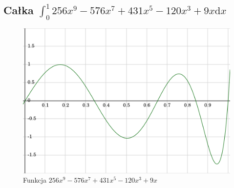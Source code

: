 \documentclass[11pt,leqno]{article}
\begin{document}
\subsection{Całka $\int_{0}^{1}256x^9 - 576x^7 + 431x^5 - 120x^3 + 9x\mathrm{d}x$}
\begin{center}\begin{figure}[ht]\begin{center}
    \caption{Funkcja $256x^9 - 576x^7 + 431x^5 - 120x^3 + 9x$}
    \includegraphics[scale=0.3,angle=0]{cheb.png}
\end{center}\end{figure}\end{center}
\end{document}
